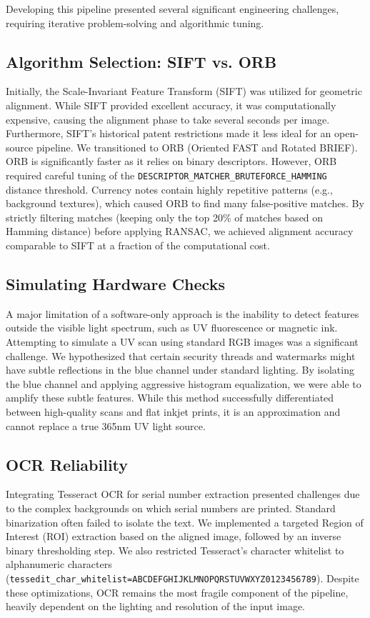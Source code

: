 \documentclass[12pt,a4paper]{article}
\begin{document}
Developing this pipeline presented several significant engineering challenges, requiring iterative problem-solving and algorithmic tuning.

\subsection{Algorithm Selection: SIFT vs. ORB}
Initially, the Scale-Invariant Feature Transform (SIFT) was utilized for geometric alignment. While SIFT provided excellent accuracy, it was computationally expensive, causing the alignment phase to take several seconds per image. Furthermore, SIFT's historical patent restrictions made it less ideal for an open-source pipeline. We transitioned to ORB (Oriented FAST and Rotated BRIEF). ORB is significantly faster as it relies on binary descriptors. However, ORB required careful tuning of the \texttt{DESCRIPTOR\_MATCHER\_BRUTEFORCE\_HAMMING} distance threshold. Currency notes contain highly repetitive patterns (e.g., background textures), which caused ORB to find many false-positive matches. By strictly filtering matches (keeping only the top 20\% of matches based on Hamming distance) before applying RANSAC, we achieved alignment accuracy comparable to SIFT at a fraction of the computational cost.

\subsection{Simulating Hardware Checks}
A major limitation of a software-only approach is the inability to detect features outside the visible light spectrum, such as UV fluorescence or magnetic ink. Attempting to simulate a UV scan using standard RGB images was a significant challenge. We hypothesized that certain security threads and watermarks might have subtle reflections in the blue channel under standard lighting. By isolating the blue channel and applying aggressive histogram equalization, we were able to amplify these subtle features. While this method successfully differentiated between high-quality scans and flat inkjet prints, it is an approximation and cannot replace a true 365nm UV light source.

\subsection{OCR Reliability}
Integrating Tesseract OCR for serial number extraction presented challenges due to the complex backgrounds on which serial numbers are printed. Standard binarization often failed to isolate the text. We implemented a targeted Region of Interest (ROI) extraction based on the aligned image, followed by an inverse binary thresholding step. We also restricted Tesseract's character whitelist to alphanumeric characters (\texttt{tessedit\_char\_whitelist=ABCDEFGHIJKLMNOPQRSTUVWXYZ0123456789}). Despite these optimizations, OCR remains the most fragile component of the pipeline, heavily dependent on the lighting and resolution of the input image.
\end{document}
